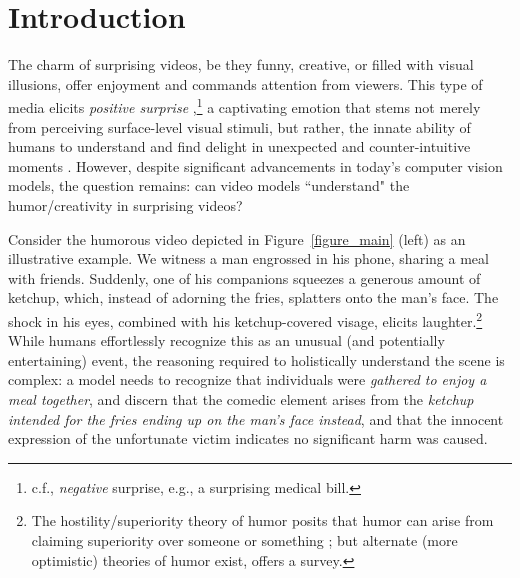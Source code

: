 \section{Introduction}
The charm of surprising videos, be they funny, creative, or filled with visual illusions, %
offer enjoyment and commands attention from viewers.
This type of media elicits \emph{positive surprise} \cite{noordewier2013valence},\footnote{c.f., \emph{negative} surprise, e.g., a surprising medical bill.}
a captivating emotion that stems not merely from perceiving surface-level visual stimuli, but rather, the innate ability of humans to understand and find delight in unexpected and counter-intuitive moments \cite{martin1983humour}. However, despite significant advancements in today's computer vision models, the question remains: can video models ``understand" the humor/creativity in surprising videos? %

Consider the humorous video depicted in Figure~\ref{figure_main} (left) as an illustrative example. We witness a man engrossed in his phone, sharing a meal with friends. Suddenly, one of his companions squeezes a generous amount of ketchup, which, instead of adorning the fries, splatters onto the man's face. The shock in his eyes, combined with his ketchup-covered visage, elicits laughter.\footnote{The hostility/superiority theory of humor posits that
humor can arise from claiming superiority over someone or something \cite{gruner1978understanding,billig2005laughter}; but alternate (more optimistic) theories of humor exist, \cite{attardo2008primer} offers a survey.} While humans effortlessly recognize this as an unusual (and potentially entertaining) event, %
the reasoning required to holistically understand the scene is complex:
a model needs to %
recognize that individuals were \textit{gathered to enjoy a meal together}, and discern that the comedic element arises from the \textit{ketchup intended for the fries ending up on the man's face instead}, and that the innocent expression of the unfortunate victim indicates no significant harm was caused.

